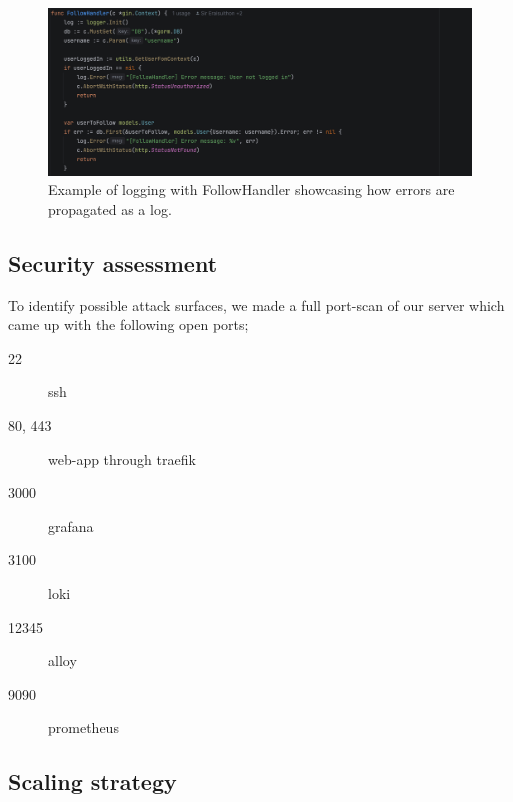 \begin{figure} [H]
    \centering
    \includegraphics[width=1\linewidth]{pictures/StdLog.png}
    \caption{Example of logging with FollowHandler showcasing how errors are propagated as a log.}
    \label{fig:enter-label}
\end{figure}


\subsection{Security assessment} %
To identify possible attack surfaces, we made a full port-scan of our server which came up with the following open ports;
\begin{description}
    \item[22] ssh
    \item[80, 443] web-app through traefik
    \item[3000] grafana
    \item[3100] loki
    \item[12345] alloy
    \item[9090] prometheus
\end{description}
\subsection{Scaling strategy} %

